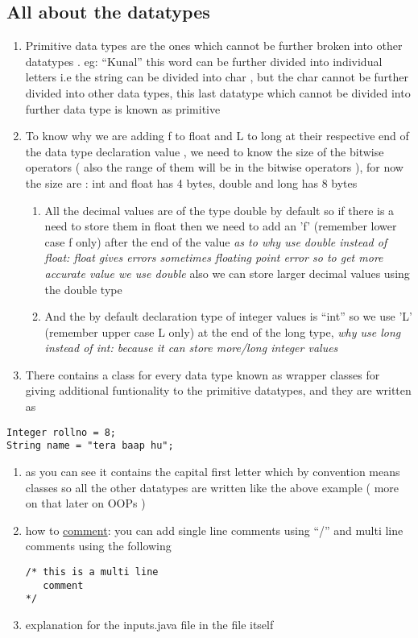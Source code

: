 \documentclass[11pt]{article}
\begin{document}
\subsection{All about the datatypes}
\label{sec:orgeab7576}
\begin{enumerate}
\item Primitive data types are the ones which cannot be further broken into other datatypes . eg: ``Kunal'' this word can be further divided into individual letters i.e the string can be divided into char , but the char cannot be further divided into other data types, this last datatype which cannot be divided into further data type is known as primitive
\item To know why we are adding f to float and L to long at their respective end of the data type declaration value , we need to know the size of the bitwise operators ( also the range of them will be in the bitwise operators ),
for now the size are : int and float has 4 bytes, double and long has 8 bytes
\begin{enumerate}
\item All the decimal values are of the type double by default so if there is a need to store them in float then we need to add an 'f' (remember lower case f only) after the end of the value
\emph{as to why use double instead of float: float gives errors sometimes floating point error so to get more accurate value we use double}
also we can  store larger decimal values using the double type
\item And the by default declaration type of integer values is ``int'' so we use 'L' (remember upper case L only) at the end of the long type,
\emph{why use long instead of int: because it can store more/long integer values}
\end{enumerate}
\item There contains a class for every data type known as wrapper classes for giving additional funtionality to the primitive datatypes, and they are written as
\end{enumerate}
\begin{verbatim}
Integer rollno = 8;
String name = "tera baap hu";
\end{verbatim}
\begin{enumerate}
\item as you can see it contains the capital first letter which by convention means classes so all the other datatypes are written like the above example ( more on that later on OOPs )

\item how to \uline{comment}:  you can add single line comments using ``/'' and multi line comments using the following
\begin{verbatim}
/* this is a multi line
   comment
*/
\end{verbatim}

\item explanation for the inputs.java file in the file itself
\end{enumerate}
\end{document}
